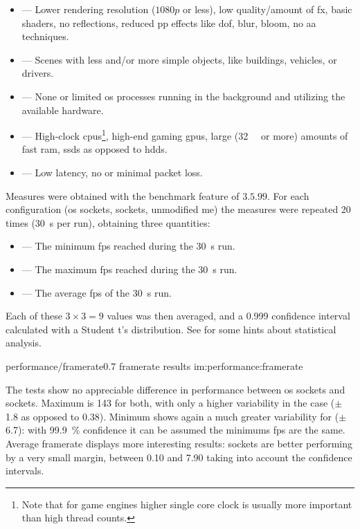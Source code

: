 \begin{itemize}
	\item {} --- Lower rendering resolution ($1080p$ or less), low quality/amount of \gls{fx}, basic shaders, no reflections, reduced \gls{pp} effects like \gls{dof}, blur, bloom, no \gls{aa} techniques.
	\item {} --- Scenes with less and/or more simple objects, like buildings, vehicles, or drivers.
	\item {} --- None or limited \gls{os} processes running in the background and utilizing the available hardware.
	\item {} --- High-clock \glspl{cpu}\footnote{Note that for game engines higher single core clock is usually more important than high thread counts.}, high-end gaming \glspl{gpu}, large (\SI{32}{\giga\byte} or more) amounts of fast \gls{ram}, \glspl{ssd} as opposed to \glspl{hdd}.
	\item {} --- Low latency, no or minimal packet loss.
\end{itemize}

Measures were obtained with the benchmark feature of  $3.5.99$. For each configuration (\gls{os} sockets,  sockets, unmodified \gls{me}) the measures were repeated \num{20} times (\SI{30}{\second} per run), obtaining three quantities:

\begin{itemize}
	\item {} --- The minimum \gls{fps} reached during the \SI{30}{\second} run.
	\item {} --- The maximum \gls{fps} reached during the \SI{30}{\second} run.
	\item {} --- The average \gls{fps} of the \SI{30}{\second} run.
\end{itemize}

\FLOATnoindent Each of these $3\times3=9$ values was then averaged, and a \num{0,999} confidence interval calculated with a Student t's distribution. See  for some hints about statistical analysis.

\begin{image}
	{performance/framerate}{0.7}
	{framerate results}
	{im:performance:framerate}
	{}
\end{image} %

The tests show no appreciable difference in performance between \gls{os} sockets and  sockets. Maximum is \SI{143}{\fps} for both, with only a higher variability in the  case ($\pm$\SI{1,8}{\fps} as opposed to \SI{0,38}{\fps}). Minimum shows again a much greater variability for  ($\pm$\SI{6,7}{\fps}): with \SI{99,9}{\percent} confidence it can be assumed the minimums \gls{fps} are the same. Average \gls{framerate} displays more interesting results:  sockets are better performing by a very small margin, between \SI{0,10}{\fps} and \SI{7,90}{\fps} taking into account the confidence intervals.

